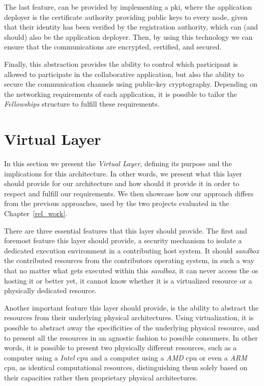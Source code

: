 \documentclass[12pt, titlepage]{uo_temp}
\begin{document}
     The last feature, can be provided by implementing a \gls{pki}, where the application
     deployer is the certificate authority providing public keys to every node, given that
     their identity has been verified by the registration authority, which can (and
     should) also be the application deployer. Then, by using this technology we can
     ensure that the communications are encrypted, certified, and secured.

     Finally, this abstraction provides the ability to control which participant is
     allowed to participate in the collaborative application, but also the ability to
     secure the communication channels using public-key cryptography. Depending on
     the networking requirements of each application, it is possible to tailor the
     \emph{Fellowships} structure to fulfill these requirements.

     \section{Virtual Layer}
     In this section we present the \emph{Virtual Layer}, defining its purpose and the
     implications for this architecture. In other words, we present what this layer should
     provide for our architecture and how should it provide it in order to respect and
     fulfill our requirements. We then showcase how our approach differs from the previous
     approaches, used by the two projects evaluated in the Chapter~\ref{rel_work}.

     There are three essential features that this layer should provide. The first and
     foremost feature this layer should provide, a security mechanism to isolate a
     dedicated execution environment in a contributing host system. It should \emph{sandbox}
     the contributed resources from the contributors operating system, in such a way that
     no matter what gets executed within this \emph{sandbox}, it can never access the
     \gls{os} hosting it or better yet, it cannot know whether it is a virtualized
     resource or a physically dedicated resource.

     Another important feature this layer should provide, is the ability to abstract the
     resources from their underlying physical architectures. Using virtualization, it is
     possible to abstract away the specificities of the underlying physical resource, and
     to present all the resources in an agnostic fashion to possible consumers. In other
     words, it is possible to present two physically different resources, such as a
     computer using a \emph{Intel} \gls{cpu} and a computer using a \emph{AMD} \gls{cpu}
     or even a \emph{ARM} \gls{cpu}, as identical computational resources, distinguishing
     them solely based on their capacities rather then proprietary physical architectures.
\end{document}
